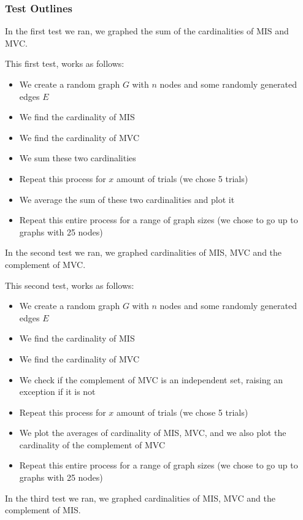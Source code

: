 \documentclass[12pt]{article}
\begin{document}
\subsubsection{Test Outlines}

In the first test we ran, we graphed the sum of the cardinalities of MIS and MVC.

This first test, works as follows:

\begin{itemize}
    \item We create a random graph $G$ with $n$ nodes and some randomly generated edges $E$
    \item We find the cardinality of MIS
    \item We find the cardinality of MVC
    \item We sum these two cardinalities 
    \item Repeat this process for $x$ amount of trials (we chose 5 trials)
    \item We average the sum of these two cardinalities and plot it 
    \item Repeat this entire process for a range of graph sizes (we chose to go up to graphs with 25 nodes)
\end{itemize}

In the second test we ran, we graphed cardinalities of MIS, MVC and the complement of MVC.

This second test, works as follows:

\begin{itemize}
    \item We create a random graph $G$ with $n$ nodes and some randomly generated edges $E$
    \item We find the cardinality of MIS
    \item We find the cardinality of MVC
    \item We check if the complement of MVC is an independent set, raising an exception if it is not
    \item Repeat this process for $x$ amount of trials (we chose 5 trials)
    \item We plot the averages of cardinality of MIS, MVC, and we also plot the cardinality of the complement of MVC
    \item Repeat this entire process for a range of graph sizes (we chose to go up to graphs with 25 nodes)
\end{itemize}

In the third test we ran, we graphed cardinalities of MIS, MVC and the complement of MIS.
\end{document}
